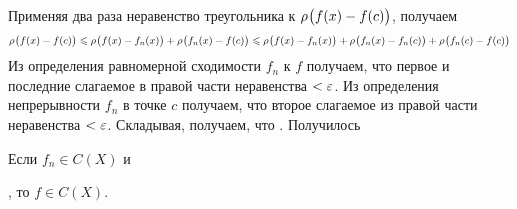\begin{prf} %
	Применяя два раза неравенство треугольника к $\rho_{}\bigl(f(x) - f(c)\bigr)$, получаем 
	\[\rho_{}\bigl(f(x) - f(c)\bigr) \leqslant \rho_{}\bigl(f(x) - f_n(x)\bigr) + \rho_{}\bigl(f_n(x) - f(c)\bigr)\leqslant \rho_{}\bigl(f(x) - f_n(x)\bigr) + \rho_{}\bigl(f_n(x) - f_n(c)\bigr) + \rho_{}\bigl(f_n(c) - f(c)\bigr)\]
	Из определения равномерной сходимости $f_n$ к $f$
	\linebreak
	 получаем, что  первое и последние слагаемое в правой части неравенства $< \varepsilon$. Из определения непрерывности $f_n$ в точке $c$ 
	 получаем, что  второе слагаемое из правой части неравенства $< \varepsilon$. Складывая, получаем, что .
	 Получилось  
\end{prf} %

\begin{slv}[https://www.youtube.com/live/oGN0SkfpZME?si=8DDuSzi86njoQaMf&t=11737]\label{непр.на X}
	Если $f_n \in C(X)$ и\!, то $f \in C(X)$. 
\end{slv} %

